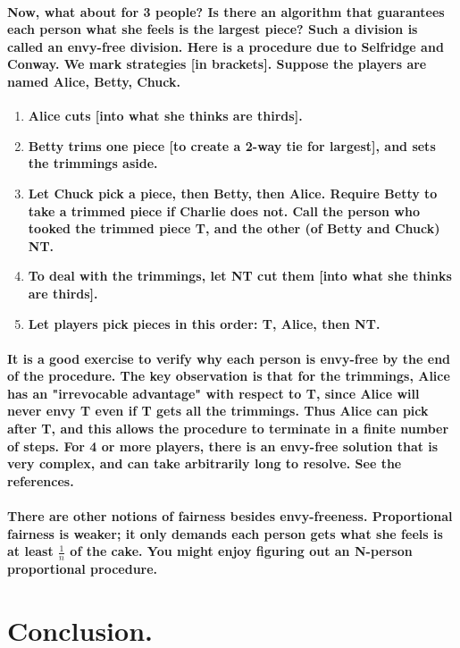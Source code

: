 \documentclass[12pt]{report}
\begin{document}
	\paragraph{Now, what about for 3 people? Is there an algorithm that guarantees each person what she feels is the largest piece? Such a division is called an envy-free division. Here is a procedure due to Selfridge and Conway. We mark strategies [in brackets]. Suppose the players are named Alice, Betty, Chuck.}
	\begin{enumerate}
		\item \textbf{Alice cuts [into what she thinks are thirds].}
		\item \textbf{Betty trims one piece [to create a 2-way tie for largest], and sets the trimmings aside.}
		\item \textbf{Let Chuck pick a piece, then Betty, then Alice. Require Betty to take a trimmed piece if Charlie does not. Call the person who tooked the trimmed piece T, and the other (of Betty and Chuck) NT.}
		\item \textbf{To deal with the trimmings, let NT cut them [into what she thinks are thirds].}
		\item \textbf{Let players pick pieces in this order: T, Alice, then NT.}
	\end{enumerate}
	\paragraph{It is a good exercise to verify why each person is envy-free by the end of the procedure. The key observation is that for the trimmings, Alice has an "irrevocable advantage" with respect to T, since Alice will never envy T even if T gets all the trimmings. Thus Alice can pick after T, and this allows the procedure to terminate in a finite number of steps. For 4 or more players, there is an envy-free solution that is very complex, and can take arbitrarily long to resolve. See the references.}
	\paragraph{There are other notions of fairness besides envy-freeness. Proportional fairness is weaker; it only demands each person gets what she feels is at least 
		$\frac{1}{n}$ of the cake. You might enjoy figuring out an N-person proportional procedure.}
	\section{Conclusion.}
\end{document}
